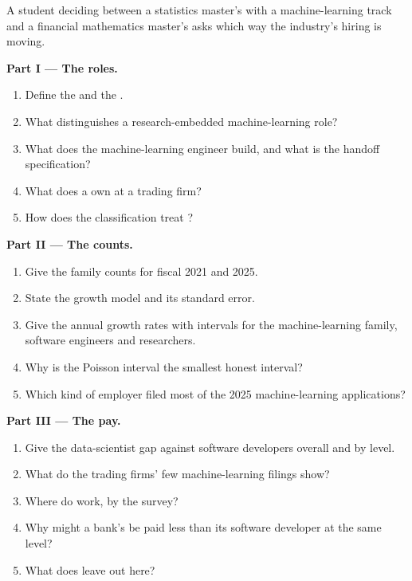 \begin{problem}\label{pb:in:machine-learning-and-data-engineer:1}
A student deciding between a statistics master's with a machine-learning track and a financial mathematics master's asks
which way the industry's hiring is moving.

\medskip\noindent\textbf{Part I --- The roles.}
\begin{enumerate}
\item Define the  and the .
\item What distinguishes a research-embedded machine-learning role?
\item What does the machine-learning engineer build, and what is the handoff specification?
\item What does a  own at a trading firm?
\item How does the classification treat ?
\end{enumerate}

\medskip\noindent\textbf{Part II --- The counts.}
\begin{enumerate}[resume]
\item Give the family counts for fiscal 2021 and 2025.
\item State the growth model and its standard error.
\item Give the annual growth rates with intervals for the machine-learning family, software engineers and researchers.
\item Why is the Poisson interval the smallest honest interval?
\item Which kind of employer filed most of the 2025 machine-learning applications?
\end{enumerate}

\medskip\noindent\textbf{Part III --- The pay.}
\begin{enumerate}[resume]
\item Give the data-scientist gap against software developers overall and by level.
\item What do the trading firms' few machine-learning filings show?
\item Where do  work, by the survey?
\item Why might a bank's  be paid less than its software developer at the same level?
\item What does  leave out here?
\end{enumerate}


\end{problem}
